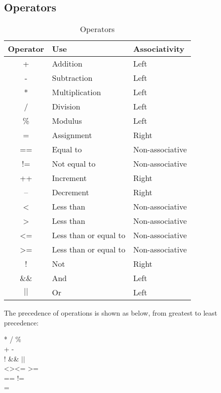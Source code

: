 \documentclass[a4paper]{article}
\begin{document}
\subsection{Operators}

\begin{table}[H]
\centering
\begin{tabular}{|c|l|l|}
\hline
Operator & Use & Associativity\\
\hline
+ & Addition & Left\\
\hline
- & Subtraction & Left \\
\hline
* & Multiplication & Left\\
\hline
/ & Division & Left \\
\hline
\% & Modulus & Left \\
\hline
= & Assignment & Right \\
\hline 
== & Equal to & Non-associative\\
\hline
!= & Not equal to & Non-associative\\
\hline 
++ & Increment & Right\\
\hline
-- & Decrement & Right\\
\hline
\textless & Less than & Non-associative\\
\hline 
\textgreater & Less than & Non-associative\\
\hline 
\textless= & Less than or equal to & Non-associative\\
\hline 
\textgreater= & Less than or equal to & Non-associative\\
\hline 
! & Not & Right\\
\hline
\&\& & And & Left\\
\hline
$||$ & Or & Left\\
\hline
\end{tabular}
\caption{Operators}
\end{table}

The precedence of operations is shown as below, from greatest to least precedence: 
\begin{center}

\selectfont
* / \% \\
+ - \\ 
! \&\& $||$ \\
\textless \quad  \textgreater \quad \textless= \quad \textgreater= \\
== \quad !=\\
=\\ 
\end{center}
\end{document}
